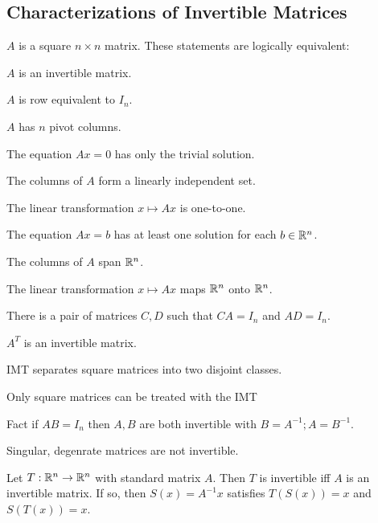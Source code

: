 \begin{card}
    \subsection{Characterizations of Invertible Matrices}

    \begin{theorem}
    $A$ is a square $n \times n$ matrix. These statements are logically
    equivalent:
    \begin{compactenum}
    \item $A$ is an invertible matrix.
    \item $A$ is row equivalent to $I_n$.
    \item $A$ has $n$ pivot columns.
    \item The equation $Ax = 0$ has only the trivial solution.
    \item The columns of $A$ form a linearly independent set.
    \item The linear transformation $x \mapsto Ax$ is one-to-one.
    \item The equation $Ax = b$ has at least one solution for each $b \in \mathbb{R}^n$.
    \item The columns of $A$ span $\mathbb{R}^n$.
    \item The linear transformation $x \mapsto Ax$ maps $\mathbb{R}^n$ onto $\mathbb{R}^n$.
    \item There is a pair of matrices $C,D$ such that $CA = I_n$ and $AD = I_n$.
    \item $A^T$ is an invertible matrix.
    \end{compactenum}
    \end{theorem}

    \begin{compactdesc}
    \item[IMT] separates square matrices into two disjoint classes.
    \item[Only square matrices] can be treated with the IMT
    \item[Fact] if $AB = I_n$ then $A, B$ are both invertible with
        $B = A^{-1}; A = B^{-1}$.
    \item[Singular, degenrate] matrices are not invertible.
    \end{compactdesc}


    \begin{theorem}
        Let $T : \mathbb{R}^n \to \mathbb{R}^n$ with standard matrix $A$. Then $T$ is
        invertible iff $A$ is an invertible matrix. If so, then $S(x) = A^{-1}x$
        satisfies $T(S(x)) = x$ and $S(T(x)) = x$.
    \end{theorem}
\end{card}


